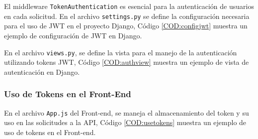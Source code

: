 El middleware \texttt{TokenAuthentication} es esencial para la autenticación de usuarios en cada solicitud. En el archivo \texttt{settings.py} se define la configuración necesaria para el uso de JWT en el proyecto Django, Código \ref{COD:configjwt} muestra un ejemplo de configuración de JWT en Django.


En el archivo \texttt{views.py}, se define la vista para el manejo de la autenticación utilizando tokens JWT, Código \ref{COD:authview} muestra un ejemplo de vista de autenticación en Django.

\subsubsection{Uso de Tokens en el Front-End}

En el archivo \texttt{App.js} del Front-end, se maneja el almacenamiento del token y su uso en las solicitudes a la API, Código \ref{COD:usetokens} muestra un ejemplo de uso de tokens en el Front-end.